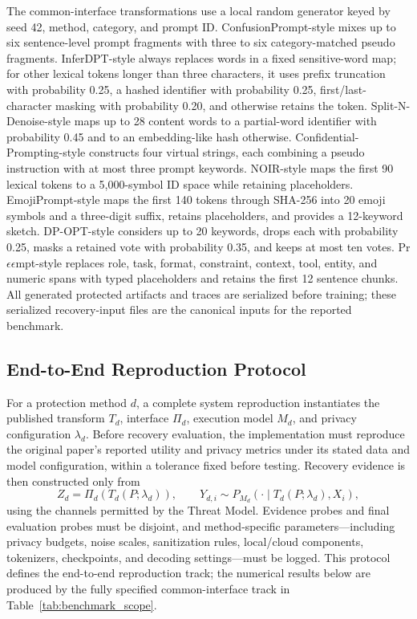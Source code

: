 \documentclass[letterpaper]{article} %
\begin{document}
The common-interface transformations use a local random generator keyed by seed 42, method, category, and prompt ID.  ConfusionPrompt-style mixes up to six sentence-level prompt fragments with three to six category-matched pseudo fragments.  InferDPT-style always replaces words in a fixed sensitive-word map; for other lexical tokens longer than three characters, it uses prefix truncation with probability 0.25, a hashed identifier with probability 0.25, first/last-character masking with probability 0.20, and otherwise retains the token.  Split-N-Denoise-style maps up to 28 content words to a partial-word identifier with probability 0.45 and to an embedding-like hash otherwise.  Confidential-Prompting-style constructs four virtual strings, each combining a pseudo instruction with at most three prompt keywords.  NOIR-style maps the first 90 lexical tokens to a 5,000-symbol ID space while retaining placeholders.  EmojiPrompt-style maps the first 140 tokens through SHA-256 into 20 emoji symbols and a three-digit suffix, retains placeholders, and provides a 12-keyword sketch.  DP-OPT-style considers up to 20 keywords, drops each with probability 0.25, masks a retained vote with probability 0.35, and keeps at most ten votes.  Pr$\epsilon\epsilon$mpt-style replaces role, task, format, constraint, context, tool, entity, and numeric spans with typed placeholders and retains the first 12 sentence chunks.  All generated protected artifacts and traces are serialized before training; these serialized recovery-input files are the canonical inputs for the reported benchmark.

\subsection{End-to-End Reproduction Protocol}

For a protection method \(d\), a complete system reproduction instantiates the published transform \(T_d\), interface \(\Pi_d\), execution model \(M_d\), and privacy configuration \(\lambda_d\).  Before recovery evaluation, the implementation must reproduce the original paper's reported utility and privacy metrics under its stated data and model configuration, within a tolerance fixed before testing.  Recovery evidence is then constructed only from
\[
Z_d=\Pi_d(T_d(P;\lambda_d)),\qquad
Y_{d,i}\sim P_{M_d}(\cdot\mid T_d(P;\lambda_d),X_i),
\]
using the channels permitted by the Threat Model.  Evidence probes and final evaluation probes must be disjoint, and method-specific parameters---including privacy budgets, noise scales, sanitization rules, local/cloud components, tokenizers, checkpoints, and decoding settings---must be logged.  This protocol defines the end-to-end reproduction track; the numerical results below are produced by the fully specified common-interface track in Table~\ref{tab:benchmark_scope}.
\end{document}
